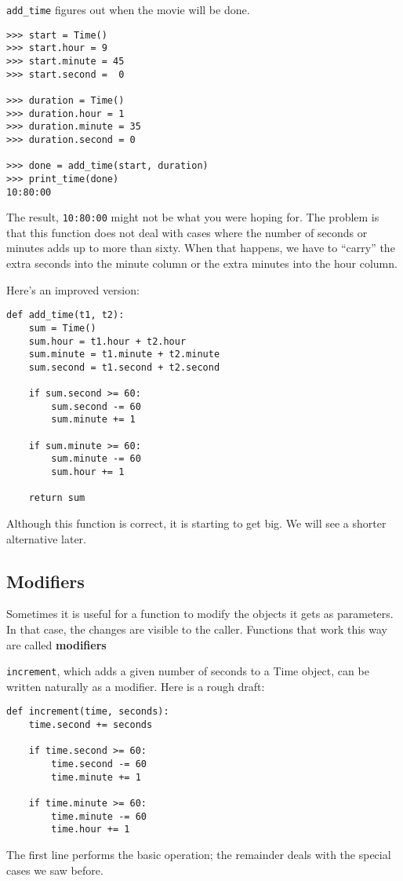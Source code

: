 \documentclass{article}
\begin{document}
\begin{multicols}{2}
\verb|add_time| figures out when the movie will be done.

\begin{lstlisting}
>>> start = Time()
>>> start.hour = 9
>>> start.minute = 45
>>> start.second =  0

>>> duration = Time()
>>> duration.hour = 1
>>> duration.minute = 35
>>> duration.second = 0

>>> done = add_time(start, duration)
>>> print_time(done)
10:80:00
\end{lstlisting}

The result, \verb|10:80:00| might not be what you were hoping for. The problem is that
this function does not deal with cases where the number of seconds or minutes
adds up to more than sixty. When that happens, we have to ``carry'' the extra
seconds into the minute column or the extra minutes into the hour column.

Here's an improved version:

\begin{lstlisting}
def add_time(t1, t2):
    sum = Time()
    sum.hour = t1.hour + t2.hour
    sum.minute = t1.minute + t2.minute
    sum.second = t1.second + t2.second

    if sum.second >= 60:
        sum.second -= 60
        sum.minute += 1

    if sum.minute >= 60:
        sum.minute -= 60
        sum.hour += 1

    return sum
\end{lstlisting}

Although this function is correct, it is starting to get big.
We will see a shorter alternative later.

\subsection{Modifiers}
Sometimes it is useful for a function to modify the objects it gets as
parameters. In that case, the changes are visible to the caller.
Functions that work this way are called \textbf{modifiers}

\verb|increment|, which adds a given number of seconds to a Time object, can
be written naturally as a modifier. Here is a rough draft:
\begin{lstlisting}
def increment(time, seconds):
    time.second += seconds

    if time.second >= 60:
        time.second -= 60
        time.minute += 1

    if time.minute >= 60:
        time.minute -= 60
        time.hour += 1
\end{lstlisting}
The first line performs the basic operation; the remainder deals with
the special cases we saw before.


\end{multicols}
\end{document}
